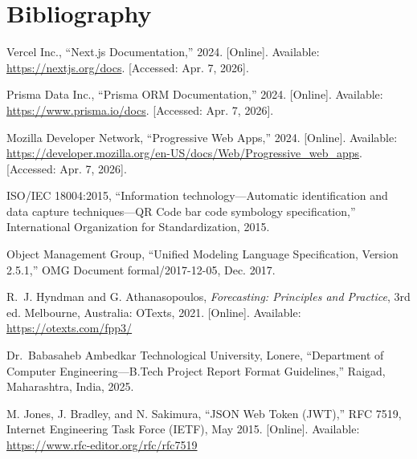 \newpage
\chapter*{Bibliography}
\thispagestyle{plain}

\noindent [1] Vercel Inc., ``Next.js Documentation,'' 2024. [Online]. Available: \url{https://nextjs.org/docs}. [Accessed: Apr. 7, 2026].

\vspace{0.3cm}

\noindent [2] Prisma Data Inc., ``Prisma ORM Documentation,'' 2024. [Online]. Available: \url{https://www.prisma.io/docs}. [Accessed: Apr. 7, 2026].

\vspace{0.3cm}

\noindent [3] Mozilla Developer Network, ``Progressive Web Apps,'' 2024. [Online]. Available: \url{https://developer.mozilla.org/en-US/docs/Web/Progressive_web_apps}. [Accessed: Apr. 7, 2026].

\vspace{0.3cm}

\noindent [4] ISO/IEC 18004:2015, ``Information technology---Automatic identification and data capture techniques---QR Code bar code symbology specification,'' International Organization for Standardization, 2015.

\vspace{0.3cm}

\noindent [5] Object Management Group, ``Unified Modeling Language Specification, Version 2.5.1,'' OMG Document formal/2017-12-05, Dec. 2017.

\vspace{0.3cm}

\noindent [6] R.~J. Hyndman and G. Athanasopoulos, \textit{Forecasting: Principles and Practice}, 3rd ed. Melbourne, Australia: OTexts, 2021. [Online]. Available: \url{https://otexts.com/fpp3/}

\vspace{0.3cm}

\noindent [7] Dr.~Babasaheb Ambedkar Technological University, Lonere, ``Department of Computer Engineering---B.Tech Project Report Format Guidelines,'' Raigad, Maharashtra, India, 2025.

\vspace{0.3cm}

\noindent [8] M. Jones, J. Bradley, and N. Sakimura, ``JSON Web Token (JWT),'' RFC 7519, Internet Engineering Task Force (IETF), May 2015. [Online]. Available: \url{https://www.rfc-editor.org/rfc/rfc7519}
